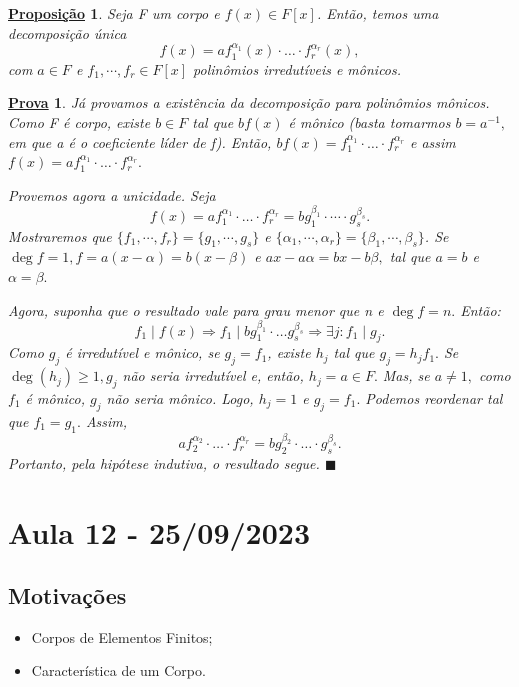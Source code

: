 \documentclass{article}
\newtheorem*{prop*}{\underline{Proposi\c c\~ao}}
\newtheorem*{proof*}{\underline{Prova}}
\renewcommand\qedsymbol{$\blacksquare$}
\begin{document}
\begin{prop*}
  Seja F um corpo e \(f(x)\in F[x]\). Então, temos uma decomposição única 
  \[
    f(x) = af_{1}^{\alpha_{1}}(x)\cdot \dotsc \cdot f_{r}^{\alpha_{r}}(x),
  \]
  com \(a\in F\) e \(f_{1}, \cdots, f_{r}\in F[x]\) polinômios irredutíveis e mônicos.
\end{prop*}
\begin{proof*}
  Já provamos a existência da decomposição para polinômios mônicos. Como F é corpo, existe \(b\in F\) tal que 
  \(bf(x)\) é mônico (basta tomarmos \(b=a^{-1},\) em que a é o coeficiente líder de f). Então, \(bf(x) = f_{1}^{\alpha_{1}}\cdot \dotsc \cdot f_{r}^{\alpha_{r}}\)
  e assim \(f(x) =af_{1}^{\alpha_{1}}\cdot \dotsc \cdot f_{r}^{\alpha_{r}}.\)

  Provemos agora a unicidade. Seja 
  \[
    f(x)=af_{1}^{\alpha_{1}} \cdot \dotsc \cdot f_{r}^{\alpha_{r}} = bg_{1}^{\beta_{1}} \cdot \cdots \cdot g_{s}^{\beta_{s}}.
  \]
  Mostraremos que \(\{f_{1}, \cdots, f_{r}\} = \{g_{1}, \cdots, g_{s}\}\) e \(\{\alpha_{1}, \cdots, \alpha_{r}\} = \{\beta_{1}, \cdots, \beta_{s}\}\).
  Se \(\deg{f} = 1, f = a(x-\alpha ) = b(x-\beta )\) e \(ax -a\alpha =bx - b\beta,\) tal que \(a=b\) e \(\alpha =\beta .\)

  Agora, suponha que o resultado vale para grau menor que n e \(\deg{f} = n.\) Então: 
  \[
    f_{1}\mid f(x) \Rightarrow f_{1}\mid bg_{1}^{\beta_{1}}\cdot \dotsc g_{s}^{\beta_{s}} \Rightarrow \exists j: f_{1}\mid g_{j}.
  \]
  Como \(g_{j}\) é irredutível e mônico, se \(g_{j}=f_{1}\), existe \(h_{j}\) tal que \(g_{j} = h_{j}f_{1}.\) Se \(\deg{(h_{j})}\geq 1, g_{j}\) não seria
  irredutível e, então, \(h_{j} = a\in F.\) Mas, se \(a\neq1,\) como \(f_{1}\) é mônico, \(g_{j}\) não seria mônico. Logo, \(h_{j} = 1\) e \(g_{j} = f_{1}.\) 
  Podemos reordenar tal que \(f_{1} = g_{1}. \) Assim, 
  \[
    af_{2}^{\alpha_{2}}\cdot \dotsc \cdot f_{r}^{\alpha_{r}} = bg_{2}^{\beta_{2}} \cdot \dotsc \cdot g_{s}^{\beta_{s}}.
  \]
  Portanto, pela hipótese indutiva, o resultado segue. \qedsymbol
\end{proof*}
\newpage

\section{Aula 12 - 25/09/2023}
\subsection{Motivações}
\begin{itemize}
  \item Corpos de Elementos Finitos;
  \item Característica de um Corpo.
\end{itemize}
\end{document}
